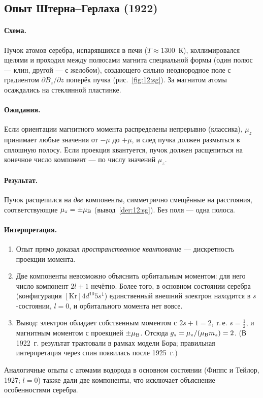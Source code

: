 \subsection{Опыт Штерна--Герлаха (1922)}

\paragraph{Схема.} Пучок атомов серебра, испарявшихся в печи ($T\approx1300$~К), коллимировался щелями
и проходил между полюсами магнита специальной формы (один полюс — клин, другой — с желобом),
создающего сильно неоднородное поле с градиентом $\partial B_z/\partial z$ поперёк пучка (рис.~\ref{fig:12:sg}).
За магнитом атомы осаждались на стеклянной пластинке.

\paragraph{Ожидания.} Если ориентации магнитного момента распределены непрерывно (классика), $\mu_z$
принимает любые значения от $-\mu$ до $+\mu$, и след пучка должен размыться в сплошную полосу. Если проекция
квантуется, пучок должен расщепиться на конечное число компонент — по числу значений $\mu_z$.

\paragraph{Результат.} Пучок расщепился на \emph{две} компоненты, симметрично смещённые на расстояния,
соответствующие $\mu_z=\pm\mu_{\mathrm B}$ (вывод~\ref{der:12:sg}). Без поля — одна полоса.

\paragraph{Интерпретация.}
\begin{enumerate}
 \item Опыт прямо доказал \emph{пространственное квантование} — дискретность проекции момента.
 \item Две компоненты невозможно объяснить орбитальным моментом: для него число компонент $2l+1$ нечётно.
       Более того, в основном состоянии серебра (конфигурация $[\mathrm{Kr}]4d^{10}5s^1$) единственный
       внешний электрон находится в $s$-состоянии, $l=0$, и орбитального момента нет вовсе.
 \item Вывод: электрон обладает собственным моментом с $2s+1=2$, т.\,е. $s=\frac12$, и магнитным моментом с
       проекцией $\pm\mu_{\mathrm B}$. Отсюда $g_s=\mu_z/(\mu_{\mathrm B} m_s)=2$. (В 1922~г. результат трактовали в рамках
       модели Бора; правильная интерпретация через спин появилась после 1925~г.)
\end{enumerate}
Аналогичные опыты с атомами водорода в основном состоянии (Фиппс и Тейлор, 1927; $l=0$) также дали две
компоненты, что исключает объяснение особенностями серебра.

